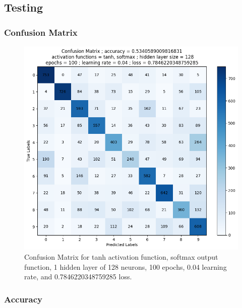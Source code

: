 \documentclass[utf8,1pt]{extarticle} %
\begin{document}
\subsection{Testing}
\subsubsection{Confusion Matrix}
\begin{figure}
    \centering
    \includegraphics[width=\textwidth]{media/confusion/confusion_matrix_activation_functions_tanh_softmax_hidden_layer_size_128_epochs_100_learning_rate_0.04_loss_0.7846220348759285.png}
    \caption{Confusion Matrix for tanh activation function, softmax output function, 1 hidden layer of 128 neurons, 100 epochs, 0.04 learning rate, and 0.7846220348759285 loss.}
    \label{fig:confusion}
\end{figure}
\subsubsection{Accuracy}
\end{document}
